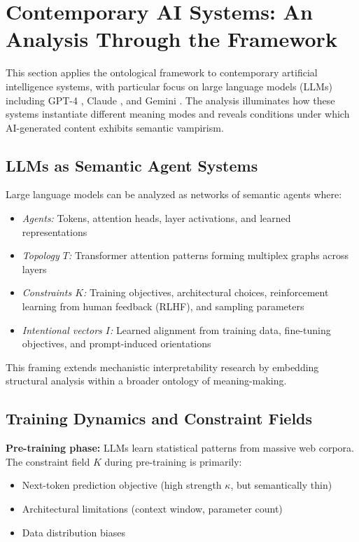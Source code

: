 \documentclass[12pt]{article}
\begin{document}
\section{Contemporary AI Systems: An Analysis Through the Framework}
\label{sec:ai-systems}

This section applies the ontological framework to contemporary artificial intelligence systems, with particular focus on large language models (LLMs) including GPT-4 \citep{openai2023gpt4}, Claude \citep{anthropic2024claude}, and Gemini \citep{google2024gemini}. The analysis illuminates how these systems instantiate different meaning modes and reveals conditions under which AI-generated content exhibits semantic vampirism.

\subsection{LLMs as Semantic Agent Systems}

Large language models can be analyzed as networks of semantic agents where:
\begin{itemize}
\item \textit{Agents:} Tokens, attention heads, layer activations, and learned representations \citep{elhage2021mathematical}
\item \textit{Topology $T$:} Transformer attention patterns forming multiplex graphs across layers \citep{vaswani2017attention}
\item \textit{Constraints $K$:} Training objectives, architectural choices, reinforcement learning from human feedback (RLHF), and sampling parameters
\item \textit{Intentional vectors $I$:} Learned alignment from training data, fine-tuning objectives, and prompt-induced orientations
\end{itemize}

This framing extends mechanistic interpretability research \citep{olah2020zoom, cammarata2020thread} by embedding structural analysis within a broader ontology of meaning-making.

\subsection{Training Dynamics and Constraint Fields}

\textbf{Pre-training phase:} LLMs learn statistical patterns from massive web corpora. The constraint field $K$ during pre-training is primarily:
\begin{itemize}
\item Next-token prediction objective (high strength $\kappa$, but semantically thin)
\item Architectural limitations (context window, parameter count)
\item Data distribution biases \citep{bender2021dangers}
\end{itemize}
\end{document}
